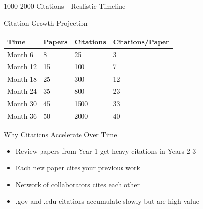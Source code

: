 \documentclass[11pt]{beamer}
\begin{document}
	\begin{frame}{1000-2000 Citations - Realistic Timeline}
		\scriptsize
		\begin{block}{Citation Growth Projection}
			\centering
			\begin{tabular}{|p{3cm}|p{3cm}|p{3cm}|p{3cm}|}
				\hline
				\textbf{Time} & \textbf{Papers} & \textbf{Citations} & \textbf{Citations/Paper} \\
				\hline
				Month 6 & 8 & 25 & 3 \\
				\hline
				Month 12 & 15 & 100 & 7 \\
				\hline
				Month 18 & 25 & 300 & 12 \\
				\hline
				Month 24 & 35 & 800 & 23 \\
				\hline
				Month 30 & 45 & 1500 & 33 \\
				\hline
				Month 36 & 50 & 2000 & 40 \\
				\hline
			\end{tabular}
		\end{block}
		\begin{block}{Why Citations Accelerate Over Time}
			\begin{itemize}
				\item Review papers from Year 1 get heavy citations in Years 2-3
				\item Each new paper cites your previous work
				\item Network of collaborators cites each other
				\item .gov and .edu citations accumulate slowly but are high value
			\end{itemize}
		\end{block}
	\end{frame}
	
\end{document}
